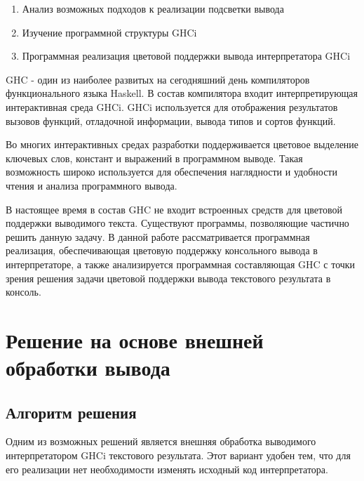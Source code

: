 







\begin{enumerate}
  \item Анализ возможных подходов к реализации подсветки вывода
  \item Изучение программной структуры GHCi
  \item Программная реализация цветовой поддержки вывода интерпретатора GHCi
\end{enumerate}  

\newpage
  
\tableofcontents

\newpage

\Intro

GHC - один из наиболее развитых на сегодняшний день компиляторов функционального языка Haskell. В состав компилятора входит интерпретирующая интерактивная среда GHCi. GHCi используется для отображения результатов вызовов функций, отладочной информации, вывода типов и сортов функций.

Во многих интерактивных средах разработки поддерживается цветовое выделение  ключевых слов, констант и выражений в программном выводе. Такая возможность широко используется для обеспечения наглядности и удобности чтения и анализа программного вывода.

В настоящее время в состав GHC не входит встроенных средств для цветовой поддержки выводимого текста. Существуют программы, позволяющие частично решить данную задачу. В данной работе рассматривается программная реализация, обеспечивающая цветовую поддержку консольного вывода в интерпретаторе, а также анализируется программная составляющая GHC с точки зрения решения задачи цветовой поддержки вывода текстового результата в консоль.

\section{Решение на основе внешней обработки вывода}
\subsection{Алгоритм решения}
Одним из возможных решений является внешняя обработка выводимого интерпретатором GHCi текстового результата. Этот вариант удобен тем, что для его реализации нет необходимости изменять исходный код интерпретатора.

